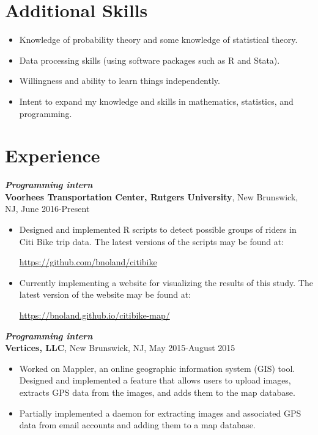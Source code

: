 \documentclass[12pt]{article}
\begin{document}
\section*{Additional Skills}

\begin{itemize}
\item
Knowledge of probability theory and some knowledge of statistical theory.
\item
Data processing skills (using software packages such as R and Stata).
\item
Willingness and ability to learn things independently.
\item
Intent to expand my knowledge and skills in mathematics, statistics, and programming.
\end{itemize}

\section*{Experience}

\textit{\textbf{Programming intern}} \\
\textbf{Voorhees Transportation Center, Rutgers University}, New Brunswick, NJ, June 2016-Present
\begin{itemize}
\item
Designed and implemented R scripts to detect possible groups of riders in Citi Bike trip data. The latest versions of the scripts may be found at:
\begin{center}
\url{https://github.com/bnoland/citibike}
\end{center}

\item
Currently implementing a website for visualizing the results of this study. The latest version of the website may be found at:
\begin{center}
\url{https://bnoland.github.io/citibike-map/}
\end{center}

\end{itemize}

\textit{\textbf{Programming intern}} \\
\textbf{Vertices, LLC}, New Brunswick, NJ, May 2015-August 2015
\begin{itemize}
\item
Worked on Mappler, an online geographic information system (GIS) tool. Designed and implemented a feature that allows users to upload images, extracts GPS data from the images, and adds them to the map database.
\item
Partially implemented a daemon for extracting images and associated GPS data from email accounts and adding them to a map database.
\end{itemize}
\end{document}
